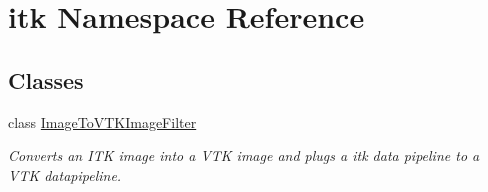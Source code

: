 \hypertarget{namespaceitk}{
\section{itk Namespace Reference}
\label{namespaceitk}
}
\subsection*{Classes}
\begin{DoxyCompactItemize}
\item 
class \hyperlink{classitk_1_1_image_to_v_t_k_image_filter}{ImageToVTKImageFilter}
\begin{DoxyCompactList}\small\item\em Converts an ITK image into a VTK image and plugs a itk data pipeline to a VTK datapipeline. \item\end{DoxyCompactList}\end{DoxyCompactItemize}
